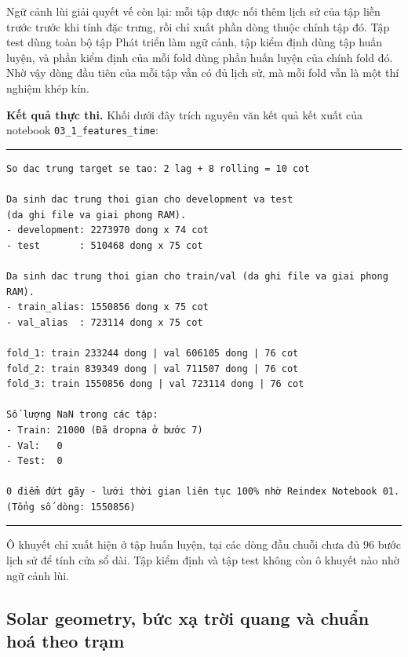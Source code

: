 Ngữ cảnh lùi giải quyết vế còn lại: mỗi tập được nối thêm lịch sử của tập liền trước
trước khi tính đặc trưng, rồi chỉ xuất phần dòng thuộc chính tập đó. Tập test dùng toàn
bộ tập Phát triển làm ngữ cảnh, tập kiểm định dùng tập huấn luyện, và phần kiểm định của
mỗi fold dùng phần huấn luyện của chính fold đó. Nhờ vậy dòng đầu tiên của mỗi tập vẫn có
đủ lịch sử, mà mỗi fold vẫn là một thí nghiệm khép kín.

\textbf{Kết quả thực thi.} Khối dưới đây trích nguyên văn kết quả kết xuất của notebook
\texttt{03\_1\_features\_time}:

\begingroup
\par\vspace{6pt}\hrule\vspace{4pt}
\footnotesize\renewcommand{\baselinestretch}{1.0}\selectfont
\begin{verbatim}
So dac trung target se tao: 2 lag + 8 rolling = 10 cot

Da sinh dac trung thoi gian cho development va test
(da ghi file va giai phong RAM).
- development: 2273970 dong x 74 cot
- test       : 510468 dong x 75 cot

Da sinh dac trung thoi gian cho train/val (da ghi file va giai phong RAM).
- train_alias: 1550856 dong x 75 cot
- val_alias  : 723114 dong x 75 cot

fold_1: train 233244 dong | val 606105 dong | 76 cot
fold_2: train 839349 dong | val 711507 dong | 76 cot
fold_3: train 1550856 dong | val 723114 dong | 76 cot

Số lượng NaN trong các tập:
- Train: 21000 (Đã dropna ở bước 7)
- Val:   0
- Test:  0

0 điểm đứt gãy - lưới thời gian liên tục 100% nhờ Reindex Notebook 01.
(Tổng số dòng: 1550856)
\end{verbatim}
\vspace{2pt}\hrule\par\vspace{6pt}
\endgroup

Ô khuyết chỉ xuất hiện ở tập huấn luyện, tại các dòng đầu chuỗi chưa đủ $96$ bước lịch sử
để tính cửa sổ dài. Tập kiểm định và tập test không còn ô khuyết nào nhờ ngữ cảnh lùi.

\FloatBarrier
\subsection{Solar geometry, bức xạ trời quang và chuẩn hoá theo trạm}

